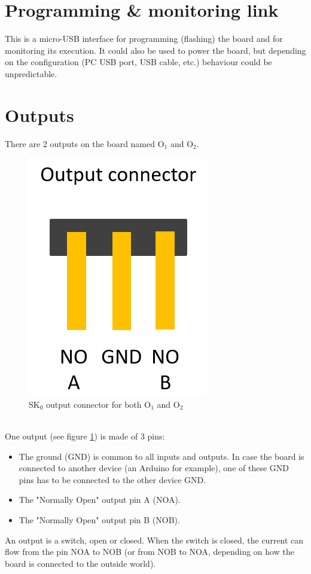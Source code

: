 \section{Programming \& monitoring link}
This is a micro-USB interface for programming (flashing) the board and for monitoring its execution. It could also be used to power the board, but depending on the configuration (PC USB port, USB cable, etc.) behaviour could be unpredictable.

\section{Outputs}
There are 2 outputs on the board named O$_1$ and O$_2$. \\
\begin{figure}[h]
\centering\includegraphics[scale=0.28]{Pictures/chapterAnnexes/sk0-output.png}
\caption{SK$_0$ output connector for both O$_1$ and O$_2$}
\label{annexes:SK0-output}
\end{figure}\\
One output (see figure \ref{annexes:SK0-output}) is made of 3 pins:
\begin{itemize}
    \item The ground (GND) is common to all inputs and outputs. In case the board is connected to another device (an Arduino for example), one of these GND pins has to be connected to the other device GND.
    \item The "Normally Open" output pin A (NOA).
    \item The "Normally Open" output pin B (NOB).
\end{itemize}
An output is a switch, open or closed. When the switch is closed, the current can flow from the pin NOA to NOB (or from NOB to NOA, depending on how the board is connected to the outside world).

